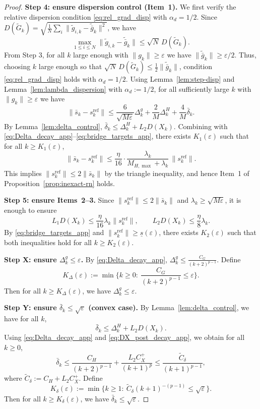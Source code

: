 \documentclass[11pt,a4paper]{article}
\begin{document}
\begin{proof}
\smallskip
\noindent\textbf{Step 4: ensure dispersion control (Item~1).}
We first verify the relative dispersion condition \eqref{eq:rel_grad_disp} with $\alpha_d=1/2$.
Since $D(\tilde G_k)=\sqrt{\frac1N\sum_i\|\tilde g_{i,k}-\tilde{\bar g}_k\|^2}$, we have
\[
\max_{1\le i\le N}\|\tilde g_{i,k}-\tilde{\bar g}_k\|
\le \sqrt{N}\,D(\tilde G_k).
\]
From Step 3, for all $k$ large enough with $\|g_k\|\ge \varepsilon$ we have $\|\tilde{\bar g}_k\|\ge \varepsilon/2$.
Thus, choosing $k$ large enough so that $\sqrt N\,D(\tilde G_k)\le \frac12\|\tilde{\bar g}_k\|$,
condition \eqref{eq:rel_grad_disp} holds with $\alpha_d=1/2$.
Using Lemma~\ref{lem:step-disp} and Lemma~\ref{lem:lambda_dispersion} with $\alpha_d:=1/2$,
for all sufficiently large $k$ with $\|g_k\|\ge \varepsilon$ we have
\[
\|\bar s_k-s_k^{\mathrm{ref}}\|
\le \frac{6}{\sqrt{M\varepsilon}}\Delta_k^g+\frac{2}{M}\Delta_k^H+\frac{4}{M}\bar\delta_k.
\]
By Lemma~\ref{lem:delta_control}, $\bar\delta_k\le \Delta_k^H+L_2D(X_k)$.
Combining with \eqref{eq:Delta_decay_app}--\eqref{eq:bridge_targets_app}, there exists $K_1(\varepsilon)$ such that for all $k\ge K_1(\varepsilon)$,
\[
\|\bar s_k-s_k^{\mathrm{ref}}\|\le \frac{\eta}{16}\cdot \frac{\lambda_k}{M_{H,\max}+\lambda_k}\,\|s_k^{\mathrm{ref}}\|.
\]
This implies $\|s_k^{\mathrm{ref}}\|\le 2\|\bar s_k\|$ by the triangle inequality, and hence Item~1 of Proposition~\ref{prop:inexact-rn} holds.

\smallskip
\noindent\textbf{Step 5: ensure Items~2--3.}
Since $\|s_k^{\mathrm{ref}}\|\le 2\|\bar s_k\|$ and $\lambda_k\ge \sqrt{M\varepsilon}$, it is enough to ensure
\[
L_1D(X_k)\le \frac{\eta}{16}\lambda_k\|s_k^{\mathrm{ref}}\|,
\qquad
L_2D(X_k)\le \frac{\eta}{8}\lambda_k.
\]
By \eqref{eq:bridge_targets_app} and $\|s_k^{\mathrm{ref}}\|\ge \underline s(\varepsilon)$, there exists $K_2(\varepsilon)$ such that both inequalities hold for all $k\ge K_2(\varepsilon)$.

\smallskip
\noindent\textbf{Step X: ensure $\Delta_k^g\le \varepsilon$.}
By \eqref{eq:Delta_decay_app}, $\Delta_k^g\le \frac{C_G}{(k+2)^{p-1}}$.
Define
\[
K_\Delta(\varepsilon):=\min\Big\{k\ge 0:\ \frac{C_G}{(k+2)^{p-1}}\le \varepsilon\Big\}.
\]
Then for all $k\ge K_\Delta(\varepsilon)$, we have $\Delta_k^g\le \varepsilon$.

\smallskip
\noindent\textbf{Step Y: ensure $\bar\delta_k\le \sqrt{\varepsilon}$ (convex case).}
By Lemma~\ref{lem:delta_control}, we have for all $k$,
\[
\bar\delta_k\le \Delta_k^H + L_2D(X_k).
\]
Using \eqref{eq:Delta_decay_app} and \eqref{eq:DX_post_decay_app}, we obtain for all $k\ge 0$,
\[
\bar\delta_k
\le \frac{C_H}{(k+2)^{p-1}}+\frac{L_2C_X^{+}}{(k+1)^p}
\le \frac{\widetilde C_\delta}{(k+1)^{p-1}},
\]
where $\widetilde C_\delta:=C_H+L_2C_X^{+}$.
Define
\[
K_\delta(\varepsilon):=\min\Big\{k\ge 1:\ \widetilde C_\delta (k+1)^{-(p-1)}\le \sqrt{\varepsilon}\Big\}.
\]
Then for all $k\ge K_\delta(\varepsilon)$, we have $\bar\delta_k\le \sqrt{\varepsilon}$.


\end{proof}
\end{document}
